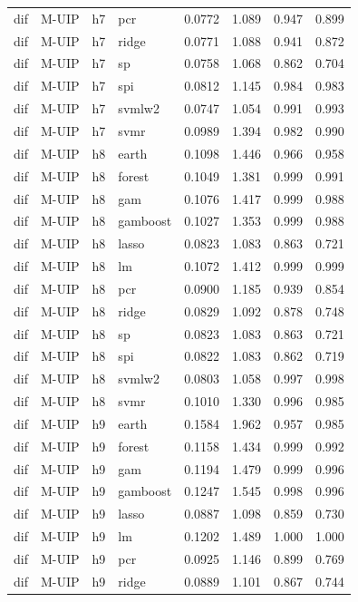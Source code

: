 \begin{ThreePartTable}
\begin{longtable}[t]{llclcccc}
dif & M-UIP & h7 & pcr & 0.0772 & 1.089 & 0.947 & 0.899\\
dif & M-UIP & h7 & ridge & 0.0771 & 1.088 & 0.941 & 0.872\\
dif & M-UIP & h7 & sp & 0.0758 & 1.068 & 0.862 & 0.704\\
dif & M-UIP & h7 & spi & 0.0812 & 1.145 & 0.984 & 0.983\\
dif & M-UIP & h7 & svmlw2 & 0.0747 & 1.054 & 0.991 & 0.993\\
dif & M-UIP & h7 & svmr & 0.0989 & 1.394 & 0.982 & 0.990\\
\addlinespace
dif & M-UIP & h8 & earth & 0.1098 & 1.446 & 0.966 & 0.958\\
dif & M-UIP & h8 & forest & 0.1049 & 1.381 & 0.999 & 0.991\\
dif & M-UIP & h8 & gam & 0.1076 & 1.417 & 0.999 & 0.988\\
dif & M-UIP & h8 & gamboost & 0.1027 & 1.353 & 0.999 & 0.988\\
dif & M-UIP & h8 & lasso & 0.0823 & 1.083 & 0.863 & 0.721\\
dif & M-UIP & h8 & lm & 0.1072 & 1.412 & 0.999 & 0.999\\
dif & M-UIP & h8 & pcr & 0.0900 & 1.185 & 0.939 & 0.854\\
dif & M-UIP & h8 & ridge & 0.0829 & 1.092 & 0.878 & 0.748\\
dif & M-UIP & h8 & sp & 0.0823 & 1.083 & 0.863 & 0.721\\
dif & M-UIP & h8 & spi & 0.0822 & 1.083 & 0.862 & 0.719\\
dif & M-UIP & h8 & svmlw2 & 0.0803 & 1.058 & 0.997 & 0.998\\
dif & M-UIP & h8 & svmr & 0.1010 & 1.330 & 0.996 & 0.985\\
\addlinespace
dif & M-UIP & h9 & earth & 0.1584 & 1.962 & 0.957 & 0.985\\
dif & M-UIP & h9 & forest & 0.1158 & 1.434 & 0.999 & 0.992\\
dif & M-UIP & h9 & gam & 0.1194 & 1.479 & 0.999 & 0.996\\
dif & M-UIP & h9 & gamboost & 0.1247 & 1.545 & 0.998 & 0.996\\
dif & M-UIP & h9 & lasso & 0.0887 & 1.098 & 0.859 & 0.730\\
dif & M-UIP & h9 & lm & 0.1202 & 1.489 & 1.000 & 1.000\\
dif & M-UIP & h9 & pcr & 0.0925 & 1.146 & 0.899 & 0.769\\
dif & M-UIP & h9 & ridge & 0.0889 & 1.101 & 0.867 & 0.744\\

\end{longtable}
\end{ThreePartTable}
